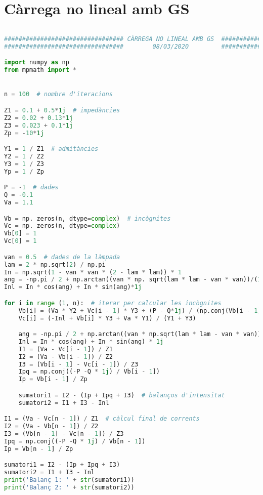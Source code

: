 \section{Càrrega no lineal amb GS}
\begin{lstlisting}[language=Python,numbers=none]
    
################################# CÀRREGA NO LINEAL AMB GS  ##################################
#################################        08/03/2020         ##################################

import numpy as np
from mpmath import *


n = 100  # nombre d'iteracions

Z1 = 0.1 + 0.5*1j  # impedàncies
Z2 = 0.02 + 0.13*1j
Z3 = 0.023 + 0.1*1j
Zp = -10*1j

Y1 = 1 / Z1  # admitàncies
Y2 = 1 / Z2
Y3 = 1 / Z3
Yp = 1 / Zp

P = -1  # dades
Q = -0.1
Va = 1.1

Vb = np. zeros(n, dtype=complex)  # incògnites
Vc = np. zeros(n, dtype=complex)
Vb[0] = 1
Vc[0] = 1

van = 0.5  # dades de la làmpada
lam = 2 * np.sqrt(2) / np.pi
In = np.sqrt(1 - van * van * (2 - lam * lam)) * 1
ang = -np.pi / 2 + np.arctan((van * np. sqrt(lam * lam - van * van))/(1 - van * van)) + np.angle(Vc[0])
Inl = In * cos(ang) + In * sin(ang)*1j

for i in range (1, n):  # iterar per calcular les incògnites
    Vb[i] = (Va * Y2 + Vc[i - 1] * Y3 + (P - Q*1j) / (np.conj(Vb[i - 1]))) / (Yp + Y2 + Y3)
    Vc[i] = (-Inl + Vb[i] * Y3 + Va * Y1) / (Y1 + Y3)

    ang = -np.pi / 2 + np.arctan((van * np.sqrt(lam * lam - van * van)) / (1 - van * van)) + np.angle(Vc[i])
    Inl = In * cos(ang) + In * sin(ang) * 1j
    I1 = (Va - Vc[i - 1]) / Z1
    I2 = (Va - Vb[i - 1]) / Z2
    I3 = (Vb[i - 1] - Vc[i - 1]) / Z3
    Ipq = np.conj((-P -Q * 1j) / Vb[i - 1])
    Ip = Vb[i - 1] / Zp

    sumatori1 = I2 - (Ip + Ipq + I3)  # balanços d'intensitat
    sumatori2 = I1 + I3 - Inl

I1 = (Va - Vc[n - 1]) / Z1  # càlcul final de corrents
I2 = (Va - Vb[n - 1]) / Z2
I3 = (Vb[n - 1] - Vc[n - 1]) / Z3
Ipq = np.conj((-P -Q * 1j) / Vb[n - 1])
Ip = Vb[n - 1] / Zp

sumatori1 = I2 - (Ip + Ipq + I3)
sumatori2 = I1 + I3 - Inl
print('Balanç 1: ' + str(sumatori1))
print('Balanç 2: ' + str(sumatori2))
\end{lstlisting}

